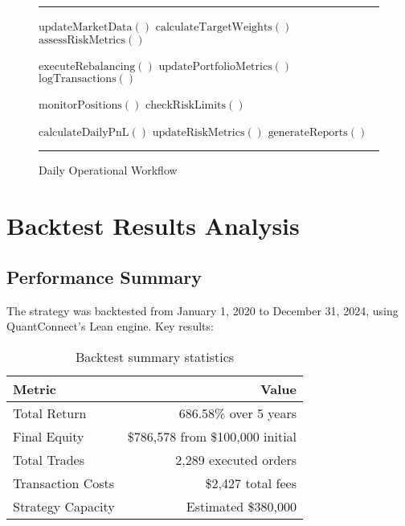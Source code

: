 \documentclass[onecolumn,11pt]{IEEEtran}
\renewenvironment{algorithm}[1][h]
  {\begin{figure}[#1]
   \centering
   \begin{minipage}{0.9\textwidth}
   \hrule
   \vspace{0.3em}}
  {\vspace{0.3em}
   \hrule
   \end{minipage}
   \end{figure}}
\begin{document}
\begin{algorithm}
\caption{Daily Operational Workflow}
\label{alg:operational}
\begin{algorithmic}[1]
    \State $\text{updateMarketData}()$ 
    \State $\text{calculateTargetWeights}()$
    \State $\text{assessRiskMetrics}()$
    
     
        \State $\text{executeRebalancing}()$
        \State $\text{updatePortfolioMetrics}()$
        \State $\text{logTransactions}()$
    \EndIf
    
    \State $\text{monitorPositions}()$ 
    \State $\text{checkRiskLimits}()$
    
    \State $\text{calculateDailyPnL}()$ 
    \State $\text{updateRiskMetrics}()$
    \State $\text{generateReports}()$
\EndFunction
\end{algorithmic}
\end{algorithm}

\section{Backtest Results Analysis}

\subsection{Performance Summary}

The strategy was backtested from January 1, 2020 to December 31, 2024, using QuantConnect's Lean engine. Key results:

\begin{table}[h]
\centering
\begin{tabular}{lr}
\toprule
\textbf{Metric} & \textbf{Value} \\
\midrule
Total Return & 686.58\% over 5 years \\
Final Equity & \$786,578 from \$100,000 initial \\
Total Trades & 2,289 executed orders \\
Transaction Costs & \$2,427 total fees \\
Strategy Capacity & Estimated \$380,000 \\
\bottomrule
\end{tabular}
\caption{Backtest summary statistics}
\end{table}
\end{document}
